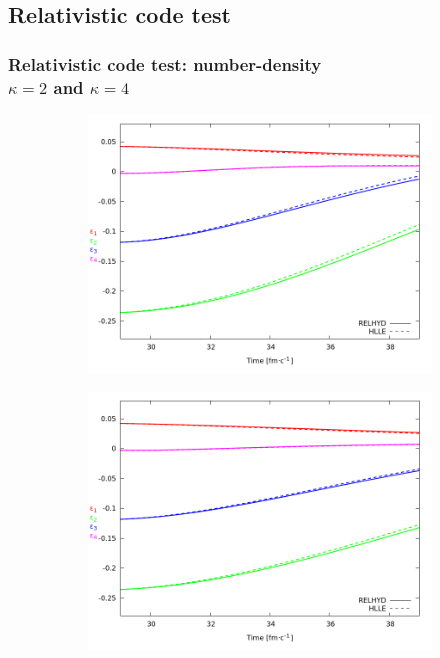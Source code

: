 \documentclass{beamer}
\begin{document}
\subsection{Relativistic code test}
\begin{frame}[noframenumbering]
\frametitle{Relativistic code test: number-density \\ $\kappa=2$ and $\kappa=4$}
\begin{center}
\begin{figure}[H]
	\centering
    \begin{subfigure}[b]{0.49\textwidth}
    		\includegraphics[width=\textwidth]{pic/res/hr_n_kappa=2}
	\end{subfigure}
	\begin{subfigure}[b]{0.49\textwidth}
        	\includegraphics[width=\textwidth]{pic/res/hr_n_kappa=4}
	\end{subfigure}
\end{figure}
\end{center}
\end{frame}
\end{document}
